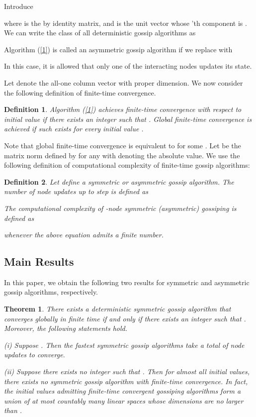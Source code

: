 \documentclass[a4paper, 11pt]{article}
\newtheorem{theorem}{Theorem}
\newtheorem{definition}{Definition}
\begin{document}
Introduce

where  is the  by  identity matrix, and   is the  unit vector whose 'th component is .   We can write the class of all deterministic gossip algorithms as

 Algorithm (\ref{1}) is called an asymmetric gossip algorithm if  we replace  with \cite{Fagnani2008}

In this case, it is allowed  that only one of the interacting nodes updates its state.

Let  denote the all-one column vector with proper dimension. We now consider the following  definition of finite-time convergence.

\medskip

\begin{definition}
Algorithm   (\ref{1})   achieves {finite-time convergence} with respect to initial value  if there exists an integer  such that . \emph{Global finite-time convergence} is achieved  if such  exists for every initial value .
\end{definition}

\medskip



Note that global finite-time convergence is equivalent to  for some . Let  be the matrix norm defined by  for any  with  denoting the absolute value. We use the following definition of computational complexity of finite-time gossip algorithms:

\medskip


\begin{definition}
Let  define a symmetric or asymmetric gossip algorithm.   The number of node updates up to step  is defined as

The computational complexity of -node symmetric (asymmetric) gossiping is defined as

whenever the above equation admits  a finite number.
\end{definition}


\subsection{Main Results}
In this paper, we obtain the following two results for symmetric and asymmetric gossip algorithms, respectively.

\medskip

\begin{theorem}\label{thmsym}
There exists a deterministic  symmetric gossip algorithm  that converges globally in finite time  if and only if there exists an integer  such that . Moreover, the following statements hold.

(i) Suppose . Then the fastest symmetric gossip algorithms take a total of  node updates to converge.

(ii) Suppose there exists no  integer  such that . Then for almost all initial values, there exists no symmetric gossip algorithm with finite-time convergence. In fact, the initial values admitting finite-time convergent gossiping algorithms form a union of at most countably many linear spaces whose dimensions are no larger than .
\end{theorem}
\end{document}
